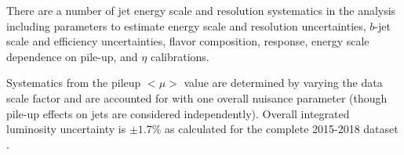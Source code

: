 There are a number of jet energy scale and resolution systematics in the analysis including parameters to estimate energy scale and resolution uncertainties, $b$-jet scale and efficiency uncertainties, flavor composition, response, energy scale dependence on pile-up, and $\eta$ calibrations.

Systematics from the pileup $<\mu>$ value are determined by varying the data scale factor and are accounted for with one overall nuisance parameter (though pile-up effects on jets are considered independently). Overall integrated luminosity uncertainty is $\pm 1.7\%$ as calculated for the complete 2015-2018 dataset \cite{ATLAS-CONF-2019-021}.

\begin{table}
\end{table}
